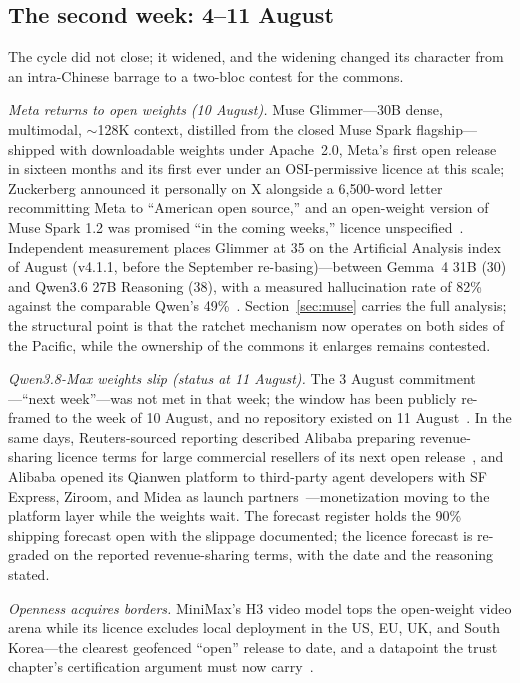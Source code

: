 \subsection{The second week: 4--11 August}

The cycle did not close; it widened, and the widening changed its character from an intra-Chinese barrage to a two-bloc contest for the commons.

\emph{Meta returns to open weights (10 August).} Muse Glimmer---30B dense, multimodal, $\sim$128K context, distilled from the closed Muse Spark flagship---shipped with downloadable weights under Apache~2.0, Meta's first open release in sixteen months and its first ever under an OSI-permissive licence at this scale; Zuckerberg announced it personally on X alongside a 6{,}500-word letter recommitting Meta to ``American open source,'' and an open-weight version of Muse Spark 1.2 was promised ``in the coming weeks,'' licence unspecified~\cite{muse-glimmer,zuck-letter}. Independent measurement places Glimmer at 35 on the Artificial Analysis index of August (v4.1.1, before the September re-basing)---between Gemma~4 31B (30) and Qwen3.6 27B Reasoning (38), with a measured hallucination rate of 82\% against the comparable Qwen's 49\%~\cite{muse-aa}. Section~\ref{sec:muse} carries the full analysis; the structural point is that the ratchet mechanism now operates on both sides of the Pacific, while the ownership of the commons it enlarges remains contested.

\emph{Qwen3.8-Max weights slip (status at 11 August).} The 3 August commitment---``next week''---was not met in that week; the window has been publicly re-framed to the week of 10 August, and no repository existed on 11 August~\cite{qwen-slip}. In the same days, Reuters-sourced reporting described Alibaba preparing revenue-sharing licence terms for large commercial resellers of its next open release~\cite{qwen-revshare}, and Alibaba opened its Qianwen platform to third-party agent developers with SF Express, Ziroom, and Midea as launch partners~\cite{qianwen-platform}---monetization moving to the platform layer while the weights wait. The forecast register holds the 90\% shipping forecast open with the slippage documented; the licence forecast is re-graded on the reported revenue-sharing terms, with the date and the reasoning stated.

\emph{Openness acquires borders.} MiniMax's H3 video model tops the open-weight video arena while its licence excludes local deployment in the US, EU, UK, and South Korea---the clearest geofenced ``open'' release to date, and a datapoint the trust chapter's certification argument must now carry~\cite{minimax-geofence}.

